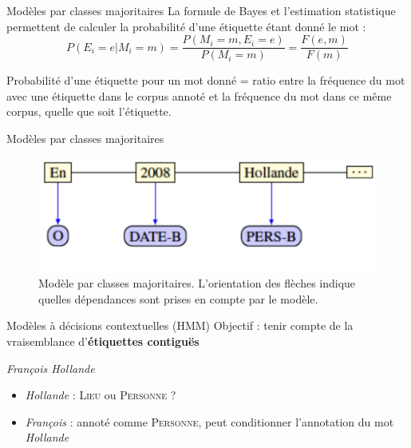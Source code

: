 \documentclass[xetex,xcolor={table,usenames,dvipsnames}]{beamer}
\newcommand{\bolder}[1]{{\color{purple}\bfseries#1}}
\begin{document}
\begin{frame}{Modèles par classes majoritaires}
	La formule de Bayes et l'estimation statistique permettent de calculer la probabilité d'une étiquette étant donné le mot :
	\begin{equation*}
	P(E_{i} = e|M_{i} = m) = \dfrac{P(M_{i} = m, E_{i} = e)}{P(M_{i} = m)} = \dfrac{F(e,m)}{F(m)}
	\end{equation*}
	
	Probabilité d'une étiquette pour un mot donné = ratio entre la fréquence du mot avec une étiquette dans le corpus annoté et la fréquence du mot dans ce même corpus, quelle que soit l'étiquette.
\end{frame}

\begin{frame}{Modèles par classes majoritaires}
					\begin{figure}[h] %
		\centering
		\includegraphics[width=.9\linewidth]{img/classes_majoritaires.png}
		\caption{Modèle par classes majoritaires. L'orientation des flèches indique quelles dépendances sont prises en compte par le modèle.}
		\label{fig:ling_out_TAL}
	\end{figure}
\end{frame}

\begin{frame}{Modèles à décisions contextuelles (\textsc{HMM})}
	Objectif : tenir compte de la vraisemblance d'\bolder{étiquettes contiguës}
	\begin{center}
		\textit{François Hollande}
	\end{center}
	
	\begin{itemize}
		\item \textit{Hollande} : \textsc{Lieu} ou \textsc{Personne} ?
		\item \textit{François} : annoté comme \textsc{Personne}, peut conditionner l'annotation du mot \textit{Hollande}
	\end{itemize}
\end{frame}
\end{document}
